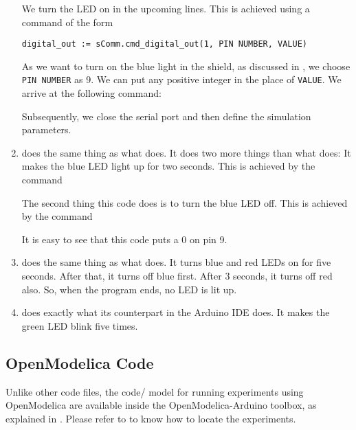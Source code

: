 \begin{enumerate}
        We turn the LED on in the upcoming lines.  This is achieved using a
        command of the form
        \begin{lstlisting}[style=nonumbers]
          digital_out := sComm.cmd_digital_out(1, PIN NUMBER, VALUE)
  \end{lstlisting}
        As we want to turn on the blue light in the shield, as discussed in
        , we choose {\tt PIN NUMBER} as 9.  We can put
        any positive integer in the place of {\tt VALUE}.  We arrive at the
        following command:
        
        Subsequently, we close the serial port and then define the simulation parameters. 
  \item {} does the same thing as what
         does.  It does two more things than what
         does: It makes the blue LED light up for two
        seconds.  This is achieved by the command
        
        The second thing this code does is to turn the blue LED off.  This
        is achieved by the command
        
        It is easy to see that this code puts a 0 on pin 9.
        
  \item {} does the same thing as what
         does.  It turns blue and red LEDs on for
        five seconds.  After that, it turns off blue first.  After 3
        seconds, it turns off red also.  So, when the program ends, no LED is
        lit up.
        
  \item {} does exactly what its counterpart
        in the Arduino IDE does.  It makes the green LED blink five times.
  \end{enumerate}

\subsection{OpenModelica Code}
Unlike other code files, the code/ model for running experiments using OpenModelica are 
available inside the OpenModelica-Arduino toolbox, as explained in .
Please refer to  to know how to locate the experiments. 
\lstset{style=mystyle}
\label{sec:led-OpenModelica-code}


